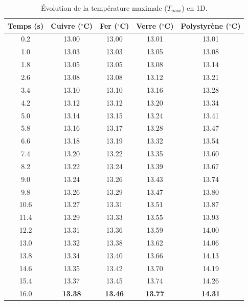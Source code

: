 \documentclass[a4paper,12pt]{article}
\begin{document}
\begin{table}[H]
    \centering
    \begin{tabular}{|c||c|c|c|c|}
        \hline
        \textbf{Temps (s)} & \textbf{Cuivre ($^\circ$C)} & \textbf{Fer ($^\circ$C)} & \textbf{Verre ($^\circ$C)} & \textbf{Polystyrène ($^\circ$C)} \\
        \hline \hline
        0.2  & 13.00 & 13.00 & 13.01 & 13.01 \\
        1.0  & 13.03 & 13.03 & 13.05 & 13.08 \\
        1.8  & 13.05 & 13.05 & 13.08 & 13.14 \\
        2.6  & 13.08 & 13.08 & 13.12 & 13.21 \\
        3.4  & 13.10 & 13.10 & 13.16 & 13.28 \\
        4.2  & 13.12 & 13.12 & 13.20 & 13.34 \\
        5.0  & 13.14 & 13.15 & 13.24 & 13.41 \\
        5.8  & 13.16 & 13.17 & 13.28 & 13.47 \\
        6.6  & 13.18 & 13.19 & 13.32 & 13.54 \\
        7.4  & 13.20 & 13.22 & 13.35 & 13.60 \\
        8.2  & 13.22 & 13.24 & 13.39 & 13.67 \\
        9.0  & 13.24 & 13.26 & 13.43 & 13.74 \\
        9.8  & 13.26 & 13.29 & 13.47 & 13.80 \\
        10.6 & 13.27 & 13.31 & 13.51 & 13.87 \\
        11.4 & 13.29 & 13.33 & 13.55 & 13.93 \\
        12.2 & 13.31 & 13.36 & 13.59 & 14.00 \\
        13.0 & 13.32 & 13.38 & 13.62 & 14.06 \\
        13.8 & 13.34 & 13.40 & 13.66 & 14.13 \\
        14.6 & 13.35 & 13.42 & 13.70 & 14.19 \\
        15.4 & 13.37 & 13.45 & 13.74 & 14.26 \\
        16.0 & \textbf{13.38} & \textbf{13.46} & \textbf{13.77} & \textbf{14.31} \\
        \hline
    \end{tabular}
    \caption{Évolution de la température maximale ($T_{max}$) en 1D.}
    \label{tab:comparaison_1d}
\end{table}
\end{document}

